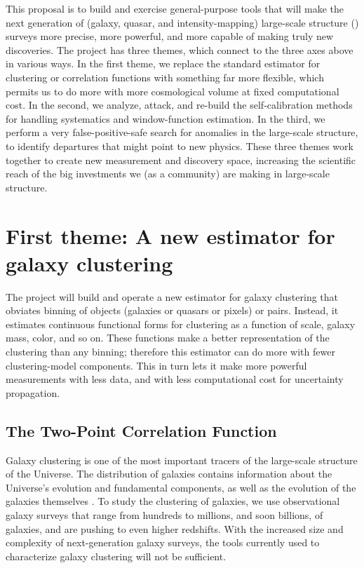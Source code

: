 \documentclass[12pt, fullpage, letterpaper]{article}
\begin{document}
This proposal is to build and exercise general-purpose tools that will
make the next generation of (galaxy, quasar, and intensity-mapping)
large-scale structure (\LSS) surveys more precise, more powerful, and
more capable of making truly new discoveries.
The project has three themes, which connect to the three axes above in
various ways.
In the first theme, we replace the standard estimator for clustering or
correlation functions with something far more flexible, which permits us
to do more with more cosmological volume at fixed computational cost.
In the second, we analyze, attack, and re-build the self-calibration 
methods for handling systematics and window-function estimation.
In the third, we perform a very false-positive-safe search for anomalies
in the large-scale structure, to identify departures that might point to
new physics.
These three themes work together to create new measurement and discovery space,
increasing the scientific reach of the big investments we (as a community)
are making in large-scale structure.

\section{First theme: A new estimator for galaxy clustering}

The project will build and operate a new estimator for
galaxy clustering that obviates binning of objects (galaxies or
quasars or pixels) or pairs. Instead, it estimates continuous
functional forms for clustering as a function of scale, galaxy mass,
color, and so on.
These functions make a better representation of the
clustering than any binning; therefore this estimator can do more with
fewer clustering-model components.
This in turn lets it make more powerful measurements with less data,
and with less computational cost for uncertainty
propagation.

\subsection{The Two-Point Correlation Function}

Galaxy clustering is one of the most important tracers of the large-scale structure of the Universe.
The distribution of galaxies contains information about the Universe's evolution and fundamental components, as well as the evolution of the galaxies themselves \citep{Hamilton1988}.
To study the clustering of galaxies, we use observational galaxy surveys that range from hundreds to millions, and soon billions, of galaxies, and are pushing to even higher redshifts.
With the increased size and complexity of next-generation galaxy surveys, the tools currently used to characterize galaxy clustering will not be sufficient.
\end{document}
